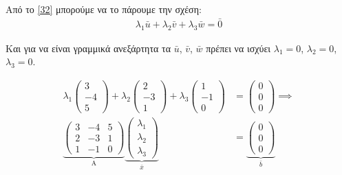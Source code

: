 \documentclass[12pt, fleqn, leqno]{extreport}
\begin{document}
Από το \eqref{32} μπορούμε να το πάρουμε την σχέση:
\begin{equation}%
    \begin{aligned}
        \lambda_{1}\bar{u} + \lambda_{2}\bar{v} + \lambda_{3}\bar{w} = \bar{0}
    \end{aligned}\label{33}
\end{equation}

Και για  να είναι γραμμικά ανεξάρτητα τα $\bar{u}$, $\bar{v}$, $\bar{w}$ πρέπει να ισχύει $\lambda_{1}=0$, $\lambda_{2}=0$, $\lambda_{3}=0$.

\begin{equation}%
    \begin{aligned}
        \lambda_{1}\begin{pmatrix}
            3 \\ -4 \\ 5
        \end{pmatrix} +
        \lambda_{2}\begin{pmatrix}
            2 \\ -3 \\ 1
        \end{pmatrix} +
        \lambda_{3}\begin{pmatrix}
            1 \\ -1 \\ 0
        \end{pmatrix}        & =
        \begin{pmatrix}
            0 \\ 0 \\ 0
        \end{pmatrix}
        \implies                                         \\
        \underbrace{
            \begin{pmatrix}
                3 & -4 & 5 \\
                2 & -3 & 1 \\
                1 & -1 & 0
            \end{pmatrix}}_\text{A}
        \underbrace{
        \begin{pmatrix}
                \lambda_{1} \\
                \lambda_{2} \\
                \lambda_{3}
            \end{pmatrix}}_\text{$\bar{x}$} & =
        \underbrace{
            \begin{pmatrix}
                0 \\
                0 \\
                0
            \end{pmatrix}}_\text{$\bar{b}$}
    \end{aligned}\label{34}
\end{equation}
\end{document}
